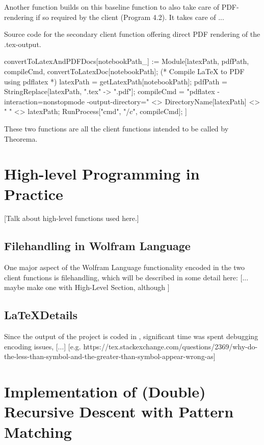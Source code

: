 Another function builds on this baseline function to also take care of PDF-rendering if so required by the client (Program 4.2). It takes care of ...

\begin{program}
\caption{Source code for the secondary client function offering direct PDF rendering of the .tex-output.}
\label{prog:AlgExample}
\begin{LaTeXCode}
convertToLatexAndPDFDocs[notebookPath_] :=  Module[{latexPath, pdfPath, compileCmd},
  convertToLatexDoc[notebookPath];
  (* Compile LaTeX to PDF using pdflatex *)
  latexPath = getLatexPath[notebookPath];
  pdfPath = StringReplace[latexPath, ".tex" -> ".pdf"];
  compileCmd = 
   "pdflatex -interaction=nonstopmode -output-directory=" <> 
    DirectoryName[latexPath] <> " " <> latexPath;
  RunProcess[{"cmd", "/c", compileCmd}];
]
\end{LaTeXCode}
\end{program}

These two functions are all the client functions intended to be called by Theorema.

\section{High-level Programming in Practice}

[Talk about high-level functions used here.]

\subsection{Filehandling in Wolfram Language}

One major aspect of the Wolfram Language functionality encoded in the two client functions is filehandling, which will be described in some detail here: [... maybe make one with High-Level Section, although \cite{noauthor_files_nodate}]

\subsection{\LaTeX Details}

Since the output of the project is coded in \LaTex, significant time was spent debugging encoding issues, [...] [e.g. https://tex.stackexchange.com/questions/2369/why-do-the-less-than-symbol-and-the-greater-than-symbol-appear-wrong-as]

\section{Implementation of (Double) Recursive Descent with Pattern Matching} \label{pattern-matching-implementation}

